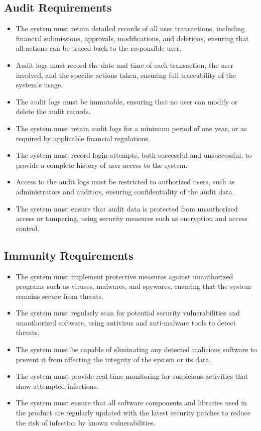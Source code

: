 \documentclass[12pt]{article}
\begin{document}
\subsection{Audit Requirements}

\begin{itemize}
  \item The system must retain detailed records of all user transactions, including financial submissions, approvals, modifications, and deletions, ensuring that all actions can be traced back to the responsible user.
  \item Audit logs must record the date and time of each transaction, the user involved, and the specific actions taken, ensuring full traceability of the system's usage.
  \item The audit logs must be immutable, ensuring that no user can modify or delete the audit records.
  \item The system must retain audit logs for a minimum period of one year, or as required by applicable financial regulations.
  \item The system must record login attempts, both successful and unsuccessful, to provide a complete history of user access to the system.
  \item Access to the audit logs must be restricted to authorized users, such as administrators and auditors, ensuring confidentiality of the audit data.
  \item The system must ensure that audit data is protected from unauthorized access or tampering, using security measures such as encryption and access control.
\end{itemize}

\subsection{Immunity Requirements}

\begin{itemize}
  \item The system must implement protective measures against unauthorized programs such as viruses, malwares, and spywares, ensuring that the system remains secure from threats.
  \item The system must regularly scan for potential security vulnerabilities and unauthorized software, using antivirus and anti-malware tools to detect threats.
  \item The system must be capable of eliminating any detected malicious software to prevent it from affecting the integrity of the system or its data.
  \item The system must provide real-time monitoring for suspicious activities that show attempted infections.
  \item The system must ensure that all software components and libraries used in the product are regularly updated with the latest security patches to reduce the risk of infection by known vulnerabilities.
\end{itemize}
\end{document}

